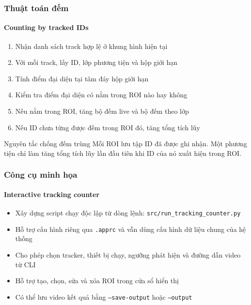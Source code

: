 \begin{frame}
\frametitle{Thuật toán đếm}
\framesubtitle{Counting by tracked IDs}

\begin{enumerate}
  \item Nhận danh sách track hợp lệ ở khung hình hiện tại
  \item Với mỗi track, lấy ID, lớp phương tiện và hộp giới hạn
  \item Tính điểm đại diện tại tâm đáy hộp giới hạn
  \item Kiểm tra điểm đại diện có nằm trong ROI nào hay không
  \item Nếu nằm trong ROI, tăng bộ đếm live và bộ đếm theo lớp
  \item Nếu ID chưa từng được đếm trong ROI đó, tăng tổng tích lũy
\end{enumerate}

\vspace{0.25cm}

\begin{block}{Nguyên tắc chống đếm trùng}
  Mỗi ROI lưu tập ID đã được ghi nhận. Một phương tiện chỉ làm tăng tổng tích
  lũy lần đầu tiên khi ID của nó xuất hiện trong ROI.
\end{block}

\end{frame}

\begin{frame}
\frametitle{Công cụ minh họa}
\framesubtitle{Interactive tracking counter}

\begin{itemize}[<+->]
  \item Xây dựng script chạy độc lập từ dòng lệnh:
        \texttt{src/run\_tracking\_counter.py}
  \item Hỗ trợ cấu hình riêng qua \texttt{.apprc} và vẫn dùng cấu hình dữ liệu
        chung của hệ thống
  \item Cho phép chọn tracker, thiết bị chạy, ngưỡng phát hiện và đường dẫn
        video từ CLI
  \item Hỗ trợ tạo, chọn, sửa và xóa ROI trong cửa sổ hiển thị
  \item Có thể lưu video kết quả bằng \texttt{--save-output} hoặc
        \texttt{--output}
\end{itemize}

\end{frame}

